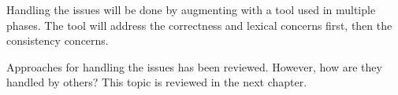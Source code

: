 Handling the {\bibtex} issues will be done by augmenting {\bibtex}
with a tool used in multiple phases.  The tool will address the
correctness and lexical concerns first, then the consistency concerns.

Approaches for handling the issues has been reviewed.  However, how
are they handled by others?  This topic is reviewed in the next
chapter.




